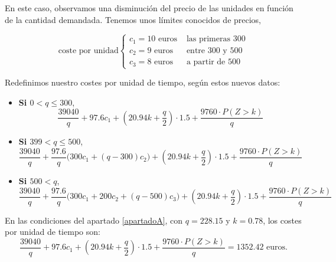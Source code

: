 \documentclass[a4paper,12pt]{article}
\begin{document}
En este caso, observamos una disminuci\'on del precio de las unidades en funci\'on de la cantidad demandada. Tenemos unos l\'imites conocidos de precios,
     
	\begin{equation*}
	\text{coste por unidad}  \left\lbrace \begin{array}{ll}	  
		c_1 = 10\text{ euros} & \text{ las primeras 300}\\
		c_2 = 9\text{ euros} & \text{ entre 300 y 500}\\ 
		c_3 = 8\text{ euros} & \text{ a partir de 500}
	\end{array}
	\right. 
	\end{equation*}
	
Redefinimos nuestro costes por unidad de tiempo, según estos nuevos datos:


\begin{itemize}
\item[] \textbf{Si $0 < q \leq 300$},
$$\dfrac{39040}{q} + 97.6c_1 + (20.94k + \dfrac{q}{2})\cdot 1.5 + \dfrac{9760\cdot P(Z > k)}{q}$$

\item[] \textbf{Si $399 < q \leq 500$},
$$\dfrac{39040}{q} + \dfrac{97.6}{q}\big(300c_1 + (q - 300)c_2\big) + (20.94k + \dfrac{q}{2})\cdot 1.5 + \dfrac{9760\cdot P(Z > k)}{q}$$

\item[] \textbf{Si $500 < q$},
$$\dfrac{39040}{q} + \dfrac{97.6}{q}\big(300c_1 + 200c_2 + (q - 500)c_3\big) + (20.94k + \dfrac{q}{2})\cdot 1.5 + \dfrac{9760\cdot P(Z > k)}{q}$$

\end{itemize}



En las condiciones del apartado \ref{apartadoA}, con $q = 228.15$ y $k = 0.78$, los costes por unidad de tiempo son:
$$\dfrac{39040}{q} + 97.6c_1 + (20.94k + \dfrac{q}{2})\cdot 1.5 + \dfrac{9760\cdot P(Z > k)}{q} = 1352.42 \text{ euros.}$$
\end{document}
